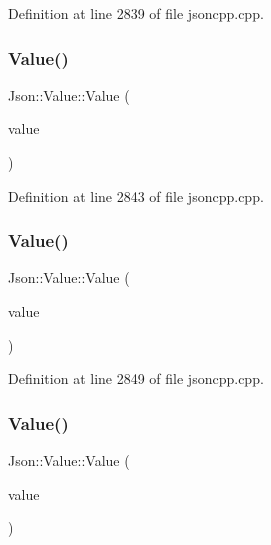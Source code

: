 Definition at line 2839 of file jsoncpp.\+cpp.

\hypertarget{class_json_1_1_value_a8adda58d5ae17bf7ca6a53bab4a7b69c}{}\label{class_json_1_1_value_a8adda58d5ae17bf7ca6a53bab4a7b69c} 
\subsubsection{\texorpdfstring{Value()}{Value()}\hspace{0.1cm}{\footnotesize\ttfamily [5/24]}}
{\footnotesize\ttfamily Json\+::\+Value\+::\+Value (\begin{DoxyParamCaption}\item[{\hyperlink{class_json_1_1_value_a8b62564be8c087c6d18de180ff4e13e3}{U\+Int64}}]{value }\end{DoxyParamCaption})}



Definition at line 2843 of file jsoncpp.\+cpp.

\hypertarget{class_json_1_1_value_a32228cc84d83200cca8441451997996c}{}\label{class_json_1_1_value_a32228cc84d83200cca8441451997996c} 
\subsubsection{\texorpdfstring{Value()}{Value()}\hspace{0.1cm}{\footnotesize\ttfamily [6/24]}}
{\footnotesize\ttfamily Json\+::\+Value\+::\+Value (\begin{DoxyParamCaption}\item[{double}]{value }\end{DoxyParamCaption})}



Definition at line 2849 of file jsoncpp.\+cpp.

\hypertarget{class_json_1_1_value_ad87b849356816aca75995dd07302e49d}{}\label{class_json_1_1_value_ad87b849356816aca75995dd07302e49d} 
\subsubsection{\texorpdfstring{Value()}{Value()}\hspace{0.1cm}{\footnotesize\ttfamily [7/24]}}
{\footnotesize\ttfamily Json\+::\+Value\+::\+Value (\begin{DoxyParamCaption}\item[{const char $\ast$}]{value }\end{DoxyParamCaption})}



